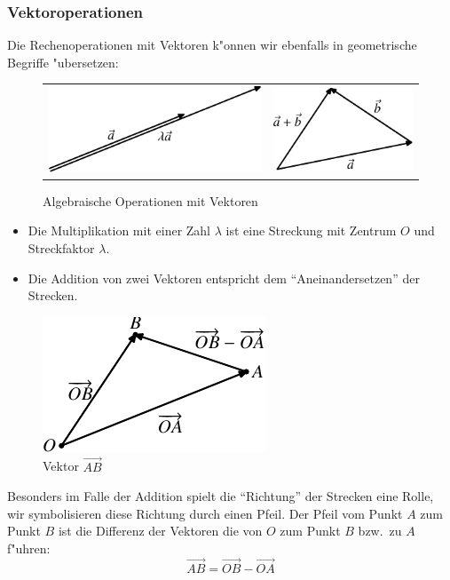 \subsubsection{Vektoroperationen}
Die Rechenoperationen mit Vektoren k"onnen wir ebenfalls in geometrische
Begriffe "ubersetzen:
\begin{figure}
\begin{center}
\begin{tabular}{cc}
\includegraphics{images/v-2}&
\includegraphics{images/v-3}
\end{tabular}
\end{center}
\caption{Algebraische Operationen mit Vektoren\label{image-vektor-operationen}}
\end{figure}
\begin{itemize}
\item Die Multiplikation mit einer Zahl $\lambda$ ist eine Streckung mit
Zentrum $O$ und Streckfaktor $\lambda$.
\item Die Addition von zwei Vektoren entspricht dem ``Aneinandersetzen''
der Strecken.
\end{itemize}
\begin{figure}
\begin{center}
\includegraphics{images/v-4}
\end{center}
\caption{Vektor $\overset{\rightarrow}{AB}$
\label{image-vektorab}}
\end{figure}
Besonders im Falle der Addition spielt die ``Richtung'' der Strecken eine
Rolle, wir symbolisieren diese Richtung durch einen Pfeil. Der Pfeil
vom Punkt $A$ zum Punkt $B$ ist die Differenz der Vektoren die von
$O$ zum Punkt $B$ bzw.~zu $A$ f"uhren:
\[
\overset{\rightarrow}{AB}=\overset{\rightarrow}{OB}-\overset{\rightarrow}{OA}
\]

